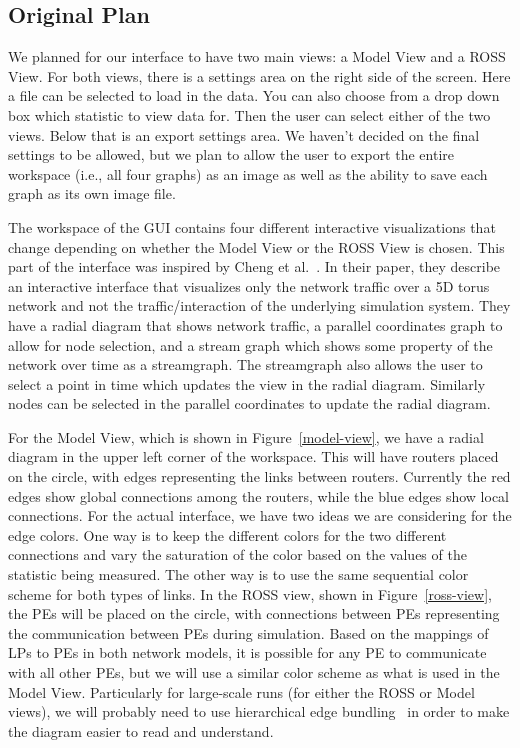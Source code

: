 \documentclass{acm_proc_article-sp}
\begin{document}
\subsection{Original Plan}
We planned for our interface to have two main views: a Model View and a ROSS View.  For both views, there is a settings area on the right side of the screen.  Here a file can be selected to load in the data.  You can also choose from a drop down box which statistic to view data for.  Then the user can select either of the two views.  Below that is an export settings area.  We haven't decided on the final settings to be allowed, but we plan to allow the user to export the entire workspace (i.e., all four graphs) as an image as well as the ability to save each graph as its own image file.  

The workspace of the GUI contains four different interactive visualizations that change depending on whether the Model View or the ROSS View is chosen.  This part of the interface was inspired by Cheng et al.~\cite{cheng}.  In their paper, they describe an interactive interface that visualizes only the network traffic over a 5D torus network and not the traffic/interaction of the underlying simulation system.  They have a radial diagram that shows network traffic, a parallel coordinates graph to allow for node selection, and a stream graph which shows some property of the network over time as a streamgraph.  The streamgraph also allows the user to select a point in time which updates the view in the radial diagram.  Similarly nodes can be selected in the parallel coordinates to update the radial diagram.

For the Model View, which is shown in Figure~\ref{model-view}, we have a radial diagram in the upper left corner of the workspace.  This will have routers placed on the circle, with edges representing the links between routers.  Currently the red edges show global connections among the routers, while the blue edges show local connections.  For the actual interface, we have two ideas we are considering for the edge colors.  One way is to keep the different colors for the two different connections and vary the saturation of the color based on the values of the statistic being measured.  The other way is to use the same sequential color scheme for both types of links.  In the ROSS view, shown in Figure~\ref{ross-view}, the PEs will be placed on the circle, with connections between PEs representing the communication between PEs during simulation.  Based on the mappings of LPs to PEs in both network models, it is possible for any PE to communicate with all other PEs, but we will use a similar color scheme as what is used in the Model View.  Particularly for large-scale runs (for either the ROSS or Model views), we will probably need to use hierarchical edge bundling~\cite{jia} in order to make the diagram easier to read and understand.  
\end{document}
